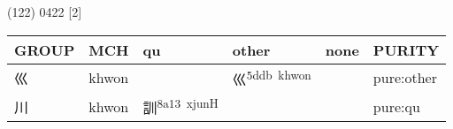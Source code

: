 \documentclass[14pt,a4paper]{scrartcl}
\begin{document}
(122) 0422 {[}2{]}

\begin{longtable}[c]{@{}llllll@{}}
\toprule
\begin{minipage}[b]{0.14\columnwidth}\raggedright\strut
GROUP
\strut\end{minipage} &
\begin{minipage}[b]{0.14\columnwidth}\raggedright\strut
MCH
\strut\end{minipage} &
\begin{minipage}[b]{0.14\columnwidth}\raggedright\strut
qu
\strut\end{minipage} &
\begin{minipage}[b]{0.14\columnwidth}\raggedright\strut
other
\strut\end{minipage} &
\begin{minipage}[b]{0.14\columnwidth}\raggedright\strut
none
\strut\end{minipage} &
\begin{minipage}[b]{0.14\columnwidth}\raggedright\strut
PURITY
\strut\end{minipage}\tabularnewline
\midrule
\endhead
\begin{minipage}[t]{0.14\columnwidth}\raggedright\strut
巛
\strut\end{minipage} &
\begin{minipage}[t]{0.14\columnwidth}\raggedright\strut
khwon
\strut\end{minipage} &
\begin{minipage}[t]{0.14\columnwidth}\raggedright\strut
\strut\end{minipage} &
\begin{minipage}[t]{0.14\columnwidth}\raggedright\strut
巛\textsuperscript{5ddb~khwon}
\strut\end{minipage} &
\begin{minipage}[t]{0.14\columnwidth}\raggedright\strut
\strut\end{minipage} &
\begin{minipage}[t]{0.14\columnwidth}\raggedright\strut
pure:other
\strut\end{minipage}\tabularnewline
\begin{minipage}[t]{0.14\columnwidth}\raggedright\strut
川
\strut\end{minipage} &
\begin{minipage}[t]{0.14\columnwidth}\raggedright\strut
khwon
\strut\end{minipage} &
\begin{minipage}[t]{0.14\columnwidth}\raggedright\strut
訓\textsuperscript{8a13~xjunH}
\strut\end{minipage} &
\begin{minipage}[t]{0.14\columnwidth}\raggedright\strut
\strut\end{minipage} &
\begin{minipage}[t]{0.14\columnwidth}\raggedright\strut
\strut\end{minipage} &
\begin{minipage}[t]{0.14\columnwidth}\raggedright\strut
pure:qu
\strut\end{minipage}\tabularnewline
\bottomrule
\end{longtable}
\end{document}
